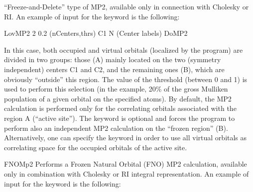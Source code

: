 \begin{keywordlist}
``Freeze-and-Delete'' type of MP2, available only in connection with Cholesky or RI.
An example of input for the keyword  is the following:
\begin{inputlisting}
LovMP2
2  0.2  (nCenters,thrs)
C1 N    (Center labels)
DoMP2
\end{inputlisting}
In this case, both occupied and virtual orbitals (localized by the program) are divided in two groups: those (A) mainly located on the
two (symmetry independent) centers C1 and C2, and the remaining ones (B), which are obviously ``outside'' this region.
The value of the threshold (between 0 and 1) is used to perform this selection
(in the example, 20\% of the gross Mulliken population of a given orbital on the specified atoms).
By default, the MP2 calculation is performed only for the correlating orbitals associated with the region A (``active site'').
The keyword  is optional and forces the program to perform also an independent MP2 calculation on
the ``frozen region'' (B).
Alternatively, one can specify the keyword  in order to use all virtual orbitals as correlating space for the
occupied orbitals of the active site.
\item[FNOMp2]
Performs a Frozen Natural Orbital (FNO) MP2 calculation, available only in combination with Cholesky or RI integral representation.
An example of input for the keyword  is the following:
\begin{inputlisting}


\end{inputlisting}
\end{keywordlist}
